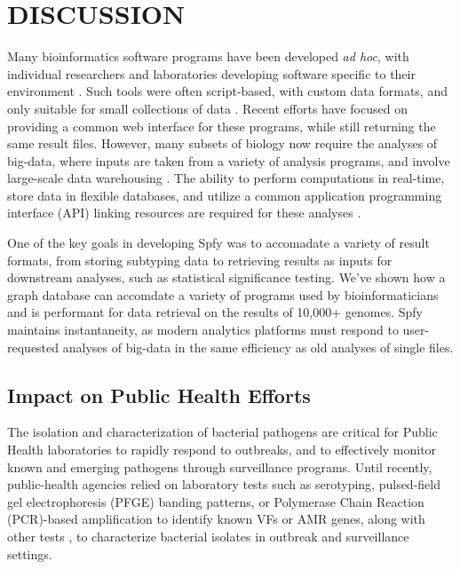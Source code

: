 \documentclass{article}
\begin{document}
\section{DISCUSSION}

Many bioinformatics software programs have been developed \textit{ad hoc}, with individual researchers and laboratories developing software specific to their environment \cite{de2015trends}.
Such tools were often script-based, with custom data formats, and only suitable for small collections of data \cite{de2015trends}.
Recent efforts \cite{goecks2010galaxy,thomsen2016bacterial} have focused on providing a common web interface for these programs, while still returning the same result files.
However, many subsets of biology now require the analyses of big-data, where inputs are taken from a variety of analysis programs, and involve large-scale data warehousing \cite{schatz2015biological}.
The ability to perform computations in real-time, store data in flexible databases, and utilize a common application programming interface (API) linking resources are required for these analyses \cite{swaminathan2016review}.

One of the key goals in developing Spfy was to accomadate a variety of result formats, from storing subtyping data to retrieving results as inputs for downstream analyses, such as statistical significance testing. We've shown how a graph database can accomdate a variety of programs used by bioinformaticians and is performant for data retrieval on the results of 10,000+ genomes. Spfy maintains instantaneity, as modern analytics platforms must respond to user-requested analyses of big-data in the same efficiency as old analyses of single files.

\subsection{Impact on Public Health Efforts}

The isolation and characterization of bacterial pathogens are critical for Public Health laboratories to rapidly respond to outbreaks, and to effectively monitor known and emerging pathogens through surveillance programs.
Until recently, public-health agencies relied on laboratory tests such as serotyping, pulsed-field gel electrophoresis (PFGE) banding patterns, or Polymerase Chain Reaction (PCR)-based amplification to identify known VFs or AMR genes, along with other tests \cite{ronholm2016navigating}, to characterize bacterial isolates in outbreak and surveillance settings.
\end{document}
